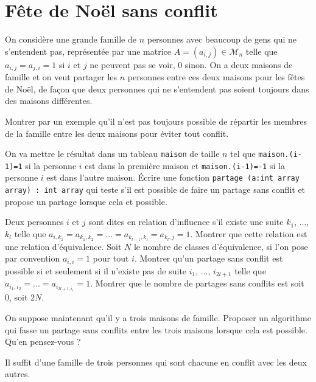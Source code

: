 \renewcommand{\SourceFile}{5-graphes/src/5-1.ml}

\section{Fête de Noël sans conflit}

On considère une grande famille de $n$ personnes avec beaucoup de gens qui ne s'entendent pas, représentée par une matrice $A=(a_{i,j})\in \mathscr{M}_n$ telle que $a_{i,j}=a_{j,i}=1$ si $i$ et $j$ ne peuvent pas se voir, 0 sinon. On a deux maisons de famille et on veut partager les $n$ personnes entre ces deux maisons pour les fêtes de Noël, de façon que deux personnes qui ne s'entendent pas soient toujours dans des maisons différentes.

\Q
Montrer par un exemple qu'il n'est pas toujours possible de répartir les membres de la famille entre les deux maisons pour éviter tout conflit.

\Q
On va mettre le résultat dans un tableau \texttt{maison} de taille $n$ tel que \texttt{maison.(i-1)=1} si la personne $i$ est dans la première maison et \texttt{maison.(i-1)=-1} si la personne $i$ est dans l'autre maison. Écrire une fonction \texttt{partage (a:int array array) : int array} qui teste s'il est possible de faire un partage sans conflit et propose un partage lorsque cela et possible.

\Q
Deux personnes $i$ et $j$ sont dites en relation d'influence s'il existe une suite $k_1$, ..., $k_l$ telle que $a_{i,k_1}=a_{k_1,k_2}=...=a_{k_{l-1},k_l}=a_{k_l,j}=1$. Montrer que cette relation est une relation d'équivalence. Soit $N$ le nombre de classes d'équivalence, si l'on pose par convention $a_{i,i}=1$ pour tout $i$. Montrer qu'un partage sans conflit est possible si et seulement si il n'existe pas de suite $i_1$, ..., $i_{2l+1}$ telle que $a_{i_1,i_2}=...=a_{i_{2l+1,i_1}}=1$. Montrer que le nombre de partages sans conflits est soit 0, soit $2N$.

\Q
On suppose maintenant qu'il y a trois maisons de famille. Proposer un algorithme qui fasse un partage sans conflits entre les trois maisons lorsque cela est possible. Qu'en pensez-vous ?

\Corrige

\Q
Il suffit d'une famille de trois personnes qui sont chacune en conflit avec les deux autres.
